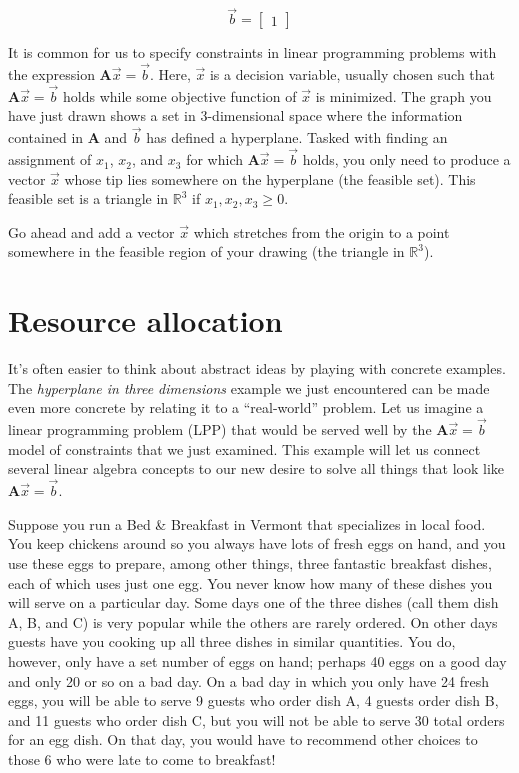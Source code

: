 \documentclass[11pt]{article}
\theoremstyle{plain} %
\theoremstyle{definition}
\theoremstyle{remark}
\begin{document}
\[
\vec{b}=
  \begin{bmatrix}
    1
  \end{bmatrix}
\]

It is common for us to specify constraints in linear programming problems with the expression $\mathbf{A}\vec{x}=\vec{b}$. Here, $\vec{x}$ is a decision variable, usually chosen such that $\mathbf{A}\vec{x}=\vec{b}$ holds while some objective function of $\vec{x}$ is minimized. The graph you have just drawn shows a set in 3-dimensional space where the information contained in $\mathbf{A}$ and $\vec{b}$ has defined a hyperplane. Tasked with finding an assignment of  $x_1$, $x_2$, and $x_3$ for which $\mathbf{A}\vec{x}=\vec{b}$ holds, you only need to produce a vector $\vec{x}$ whose tip lies somewhere on the hyperplane (the feasible set). This feasible set is a triangle in $\mathbb{R}^3$ if $x_1, x_2, x_3 \ge 0 $. 

\bigskip

Go ahead and add a vector $\vec{x}$ which stretches from the origin to a point somewhere in the feasible region of your drawing (the triangle in $\mathbb{R}^3$).

\newpage

\section{Resource allocation}
It's often easier to think about abstract ideas by playing with concrete examples. The \textit{hyperplane in three dimensions} example we just encountered can be made even more concrete by relating it to a ``real-world'' problem. Let us imagine a linear programming problem (LPP) that would be served well by the $\mathbf{A}\vec{x}=\vec{b}$ model of constraints that we just examined. This example will let us connect several linear algebra concepts to our new desire to solve all things that look like $\mathbf{A}\vec{x}=\vec{b}$.

\bigskip

Suppose you run a Bed \& Breakfast in Vermont that specializes in local food. You keep chickens around so you always have lots of fresh eggs on hand, and you use these eggs to prepare, among other things, three fantastic breakfast dishes, each of which uses just one egg. You never know how many of these dishes you will serve on a particular day. Some days one of the three dishes (call them dish A, B, and C) is very popular while the others are rarely ordered. On other days guests have you cooking up all three dishes in similar quantities. You do, however, only have a set number of eggs on hand; perhaps 40 eggs on a good day and only 20 or so on a bad day. On a bad day in which you only have 24 fresh eggs, you will be able to serve 9 guests who order dish A, 4 guests order dish B, and 11 guests who order dish C, but you will not be able to serve 30 total orders for an egg dish. On that day, you would have to recommend other choices to those 6 who were late to come to breakfast!
\end{document}
